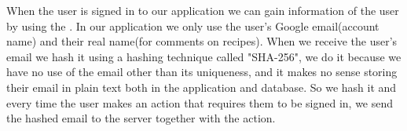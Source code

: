 When the user is signed in to our application we can gain information of the user by using the .
In our application we only use the user's Google email(account name) and their real name(for comments on recipes). 
When we receive the user's email we hash it using a hashing technique called "SHA-256", we do it because we have no use of the email other than its uniqueness, and it makes no sense storing their email in plain text both in the application and database. 
So we hash it and every time the user makes an action that requires them to be signed in, we send the hashed email to the server together with the action. 



